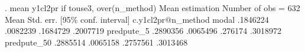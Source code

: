 . mean y1cl2pr if touse3, over(n_method)
{\smallskip}
Mean estimation                                  Number of obs = 632
{\smallskip}
                   {\VBAR}       Mean   Std. err.     [95\% conf. interval]
c.y1cl2pr@n_method {\VBAR}
            modal  {\VBAR}   .1846224   .0082239      .1684729    .2007719
       predpute_5  {\VBAR}   .2890356   .0065496       .276174    .3018972
      predpute_50  {\VBAR}   .2885514   .0065158      .2757561    .3013468
